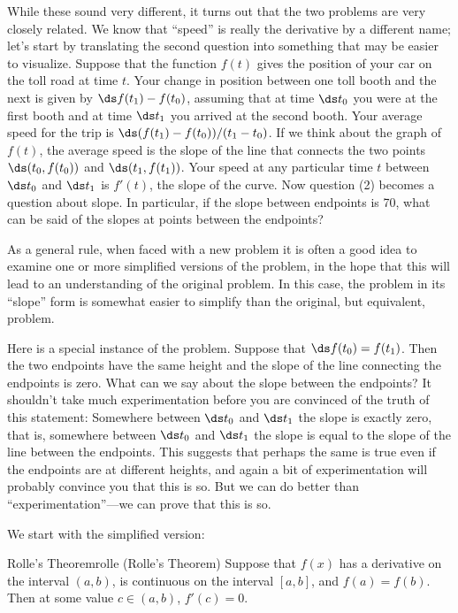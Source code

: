 While these sound very different, it turns out that the two problems
are very closely related. We know that ``speed'' is really the
derivative by a different name; let's start by translating the second
question into something that may be easier to visualize. Suppose that
the function $f(t)$ gives the position of your car on the toll road at
time $t$. Your change in position between one toll booth and the next
is given by $\ds f(t_1)-f(t_0)$, assuming that at time $\ds t_0$ you were at
the first booth and at time $\ds t_1$ you arrived at the second
booth. Your average speed for the trip is
$\ds (f(t_1)-f(t_0))/(t_1-t_0)$. If we think about the graph of $f(t)$,
the average speed is the slope of the line that connects the two
points $\ds (t_0,f(t_0))$ and $\ds (t_1,f(t_1))$. Your speed at any particular time
$t$ between $\ds t_0$ and $\ds t_1$ is $f'(t)$, the slope of the curve. Now
question (2) becomes a question about slope. In particular, if the
slope between endpoints is 70, what can be said of the slopes at
points between the endpoints?

As a general rule, when faced with a new problem it is often a good idea to
examine one or more simplified versions of the problem, in the hope
that this will lead to an understanding of the original problem.
In this case, the problem in its ``slope'' form is somewhat easier to
simplify than the original, but equivalent, problem.
 
Here is a special instance of the problem. Suppose that
$\ds f(t_0)=f(t_1)$. Then the two endpoints have the same height and the
slope of the line connecting the endpoints is zero. What can we say
about the slope between the endpoints? It shouldn't take much
experimentation before you are convinced of the truth of this
statement: Somewhere between $\ds t_0$ and $\ds t_1$ the slope is exactly
zero, that is, somewhere between $\ds t_0$ and $\ds t_1$ the slope is equal to
the slope of the line between the endpoints. This suggests that
perhaps the same is true even if the endpoints are at different
heights, and again a bit of experimentation will probably convince you
that this is so. But we can do better than ``experimentation''---we
can prove that this is so.

We start with the simplified version:

\begin{theorem}{Rolle's Theorem}{rolle}
(Rolle's Theorem) Suppose that $f(x)$ has a derivative on the
interval $(a,b)$, is continuous on the interval $[a,b]$, and
$f(a)=f(b)$. Then at some value $c\in (a,b)$, $f'(c)=0$.
\end{theorem}

